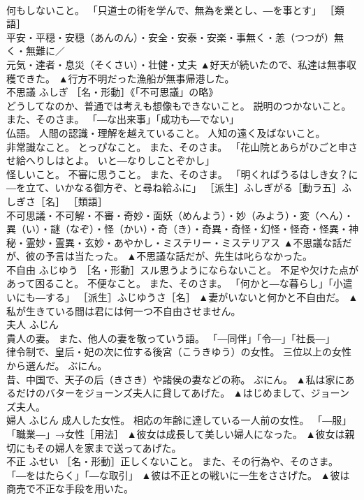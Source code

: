 \documentclass[8pt]{extreport}
\begin{document}
\begin{CJK}{UTF8}{min}
\\	何もしないこと。 「只道士の術を学んで、無為を業とし、―を事とす」 ［類語］
\\	平安・平穏・安穏（あんのん）・安全・安泰・安楽・事無く・恙（つつが）無く・無難に／
\\	元気・達者・息災（そくさい）・壮健・丈夫	▲好天が続いたので、私達は無事収穫できた。 ▲行方不明だった漁船が無事帰港した。
\\	不思議	ふしぎ	［名・形動］《「不可思議」の略》 
\\	どうしてなのか、普通では考えも想像もできないこと。 説明のつかないこと。 また、そのさま。 「―な出来事」「成功も―でない」 
\\	仏語。 人間の認識・理解を越えていること。 人知の遠く及ばないこと。 
\\	非常識なこと。 とっぴなこと。 また、そのさま。 「花山院とあらがひごと申させ給へりしはとよ。 いと―なりしことぞかし」 
\\	怪しいこと。 不審に思うこと。 また、そのさま。 「明くればうるはしき女？に―を立て、いかなる御方ぞ、と尋ね給ふに」 ［派生］ふしぎがる［動ラ五］ふしぎさ［名］ ［類語］
\\	不可思議・不可解・不審・奇妙・面妖（めんよう）・妙（みよう）・変（へん）・異（い）・謎（なぞ）・怪（かい）・奇（き）・奇異・奇怪・幻怪・怪奇・怪異・神秘・霊妙・霊異・玄妙・あやかし・ミステリー・ミステリアス	▲不思議な話だが、彼の予言は当たった。 ▲不思議な話だが、先生は叱らなかった。
\\	不自由	ふじゆう	［名・形動］スル思うようにならないこと。 不足や欠けた点があって困ること。 不便なこと。 また、そのさま。 「何かと―な暮らし」「小遣いにも―する」 ［派生］ふじゆうさ［名］	▲妻がいないと何かと不自由だ。 ▲私が生きている間は君には何一つ不自由させません。
\\	夫人	ふじん	
\\	貴人の妻。 また、他人の妻を敬っていう語。 「―同伴」「令―」「社長―」 
\\	律令制で、皇后・妃の次に位する後宮（こうきゆう）の女性。 三位以上の女性から選んだ。 ぶにん。 
\\	昔、中国で、天子の后（きさき）や諸侯の妻などの称。 ぶにん。	▲私は家にあるだけのバターをジョーンズ夫人に貸してあげた。 ▲はじめまして、ジョーンズ夫人。
\\	婦人	ふじん	成人した女性。 相応の年齢に達している一人前の女性。 「―服」「職業―」→女性［用法］	▲彼女は成長して美しい婦人になった。 ▲彼女は親切にもその婦人を家まで送ってあげた。
\\	不正	ふせい	［名・形動］正しくないこと。 また、その行為や、そのさま。 「―をはたらく」「―な取引」	▲彼は不正との戦いに一生をささげた。 ▲彼は商売で不正な手段を用いた。

\end{CJK}
\end{document}
